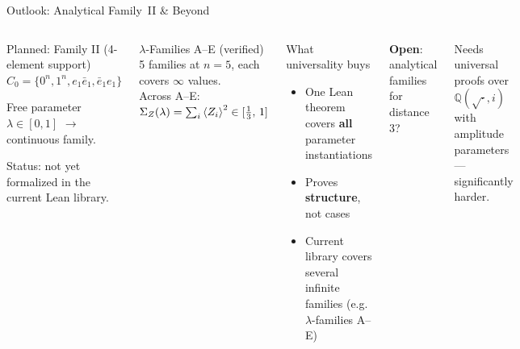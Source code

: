 \documentclass[aspectratio=169,t,10pt]{beamer}
\newcommand{\QQ}{\mathbb{Q}}
\begin{document}
\begin{frame}{Outlook: Analytical Family~II \& Beyond}

\vspace{-0.2em}
\begin{columns}[T]
\begin{block}{Planned: Family II (4-element support)}
$C_0 = \{0^n, 1^n, e_1 \bar{e}_1, \bar{e}_1 e_1 \}$

Free parameter $\lambda \in [0,1]$ $\to$ continuous family.

\textcolor{Slate}{\small Status: not yet formalized in the current Lean library.}
\end{block}

\begin{alertblock}{$\lambda$-Families A--E (verified)}
5 families at $n{=}5$, each covers $\infty$ values.\\
Across A--E: $\Sigma_Z(\lambda)=\sum_i \braket{Z_i}^2 \in [\tfrac{1}{3},\,1]$
\end{alertblock}

\begin{exampleblock}{What universality buys}
\begin{itemize}\setlength\itemsep{0pt}
\item One Lean theorem covers \textbf{all} parameter instantiations
\item Proves \textbf{structure}, not cases
\item Current library covers several infinite families (e.g. $\lambda$-families A--E)
\end{itemize}
\end{exampleblock}

\textbf{Open}: analytical families for \alert{distance 3}?

\textcolor{Slate}{\small Needs universal proofs over $\QQ(\sqrt{\cdot},i)$
with amplitude parameters --- significantly harder.}
\end{columns}
\end{frame}
\end{document}
